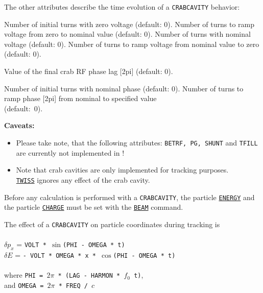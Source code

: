 The other attributes describe the time evolution of a {\tt CRABCAVITY} behavior:

{\begin{madlist}  
   Number of initial turns with zero voltage (default: 0). 
   Number of turns to ramp voltage from zero to nominal value (default: 0). 
   Number of turns with nominal voltage (default: 0). 
   Number of turns to ramp voltage from nominal value to zero (default: 0).  

   Value of the final crab RF phase lag [2pi] (default: 0).

   Number of initial turns with nominal phase (default: 0). 
   Number of turns to ramp phase [2pi] from nominal to
    specified value \\ (default:~0). 

\end{madlist}

{\bf Caveats:}
\begin{itemize}
   \item Please take note, that the following \madeight attributes:
     {\tt BETRF, PG, SHUNT} and {\tt TFILL} are currently not implemented in 
     \madx!
   \item Note that crab cavities are only implemented for
     tracking  purposes. \\ \hyperref[chap:twiss]{\tt TWISS} ignores any effect 
     of the crab cavity.  
\end{itemize} 


Before any calculation is performed with a {\tt CRABCAVITY}, the particle
\hyperref[sec:beam]{\tt ENERGY} and the particle \hyperref[sec:beam]{\tt CHARGE} 
must be set with the \hyperref[sec:beam]{\tt BEAM} command.   

The effect of a {\tt CRABCAVITY} on particle coordinates during tracking is
\\
\\ $\delta p_x$  = {\tt VOLT * }$\sin${\tt(PHI - OMEGA * t)} 
\\ $\delta E$  = {\tt- VOLT * OMEGA * x * }$\cos${\tt(PHI - OMEGA * t)} 
\\ 
\\ where {\tt PHI =  $2\pi$ * (LAG - HARMON * $f_0$ t)}, 
\\ and {\tt OMEGA = $2\pi$ * FREQ / $c$}
\\


}

